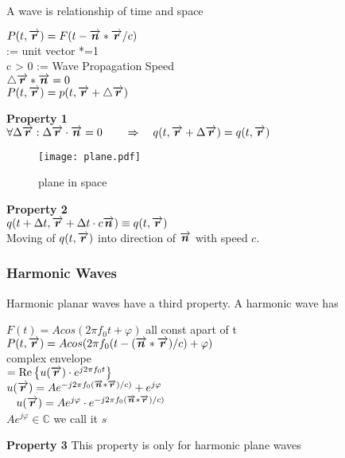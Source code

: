 \pfeil A wave is relationship of time and space

\null\qquad $ P(t,\vecp{r}) = F(t- \vecp{n}*\vecp{r}/c) $\\
\null\qquad\pfeil {} := unit vector *=1\\
\null\qquad\pfeil c > 0    := Wave Propagation Speed \\
\null\qquad\pfeil $\triangle\vecp{r}*\vecp{n} = 0$\\

\null\qquad $ P(t, \vecp{r}) = p(t, \vecp{r}+\triangle\vecp{r}) $

\textbf{Property 1}\\
$\forall \Delta \vecp{r}: \Delta \vecp{r} \cdot \vecp{n} = 0 \quad \pfeil q(t,\vecp{r}+\Delta \vecp{r})= q(t,\vecp{r})$\\
\begin{figure}[H]
	\centering
	\texttt{[image: plane.pdf]}
	\caption{plane in space}
	\label{plane} 
\end{figure}

\textbf{Property 2}\\
$q(t+\Delta t, \vecp{r} + \Delta t\cdot c \vecp{n}) \equiv q(t,\vecp{r})$\\
Moving of $q(t,\vecp{r})$ into direction of $\vecp{n}$ with speed $c$.\\


\subsubsection{Harmonic Waves}
Harmonic planar waves have a third property. A harmonic wave has 

$ F(t) = A cos(2 \pi f_0 t + \varphi)$ \pfeil all const apart of t \\
$ P(t, \vecp{r}) = A cos(2 \pi f_0 (t - (\vecp{n}*\vecp{r})/c)+\varphi)$\\
\null\qquad \pfeil complex envelope\\
\null\qquad $ = \Re{u(\vecp{r})\cdot e^{j 2 \pi f_0 t}}$\\

$ u(\vecp{r}) = A e^{-j 2 \pi f_0 (\vecp{n}*\vecp{r})/c)} + e^{j\varphi} $\\ 
$ u(\vecp{r}) = A e^{j \varphi} \cdot e^{-j 2 \pi f_0 (\vecp{n}*\vecp{r})/c)} $\\
\null\qquad \pfeil $A e^{j \varphi} \in \mathbb{C} $ we call it $s$

\textbf{Property 3}
This property is only for harmonic plane waves \\


